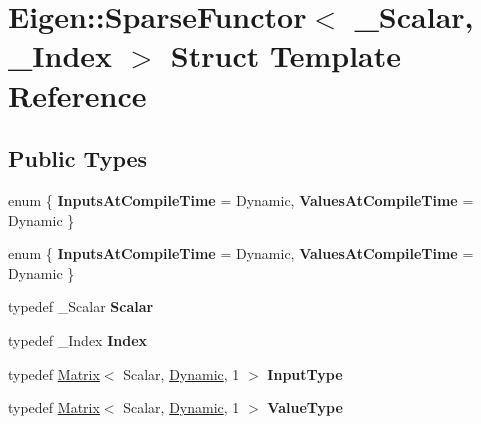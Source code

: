 \hypertarget{struct_eigen_1_1_sparse_functor}{}\section{Eigen\+:\+:Sparse\+Functor$<$ \+\_\+\+Scalar, \+\_\+\+Index $>$ Struct Template Reference}
\label{struct_eigen_1_1_sparse_functor}
\subsection*{Public Types}
\begin{DoxyCompactItemize}
\item 
\mbox{\label{struct_eigen_1_1_sparse_functor_a53a2f49e246113be05d952950b56566e}} 
enum \{ {\bfseries Inputs\+At\+Compile\+Time} = Dynamic, 
{\bfseries Values\+At\+Compile\+Time} = Dynamic
 \}
\item 
\mbox{\label{struct_eigen_1_1_sparse_functor_afa8239d4935a05c6f7f0613306710964}} 
enum \{ {\bfseries Inputs\+At\+Compile\+Time} = Dynamic, 
{\bfseries Values\+At\+Compile\+Time} = Dynamic
 \}
\item 
\mbox{\label{struct_eigen_1_1_sparse_functor_af12536b3c9c3daa1bf07ff20c3a17006}} 
typedef \+\_\+\+Scalar {\bfseries Scalar}
\item 
\mbox{\label{struct_eigen_1_1_sparse_functor_a697f8f4cc239a94b0a949f6a67cac5de}} 
typedef \+\_\+\+Index {\bfseries Index}
\item 
\mbox{\label{struct_eigen_1_1_sparse_functor_ac39c315aa73792726c273d6f2bdd635e}} 
typedef \hyperlink{group___core___module_class_eigen_1_1_matrix}{Matrix}$<$ Scalar, \hyperlink{namespace_eigen_ad81fa7195215a0ce30017dfac309f0b2}{Dynamic}, 1 $>$ {\bfseries Input\+Type}
\item 
\mbox{\label{struct_eigen_1_1_sparse_functor_aa7e457fabeb3123822afc0493e35e2ce}} 
typedef \hyperlink{group___core___module_class_eigen_1_1_matrix}{Matrix}$<$ Scalar, \hyperlink{namespace_eigen_ad81fa7195215a0ce30017dfac309f0b2}{Dynamic}, 1 $>$ {\bfseries Value\+Type}

\end{DoxyCompactItemize}
